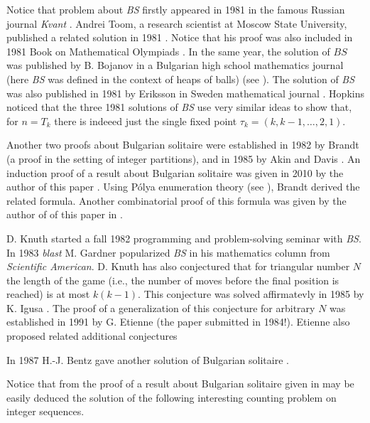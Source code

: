 \documentclass[oneside,12pt]{amsart}
\theoremstyle{definition}
\numberwithin{equation}{section}
\begin{document}
Notice that problem about {\it BS} firstly appeared in 1981 in the famous 
Russian journal 
{\it Kvant} \cite{to}. Andrei Toom, a research scientist at Moscow State 
University, published a related solution in 1981 \cite{to}.
Notice that his proof was also included in  1981  Book on Mathematical 
Olympiads \cite{vgrt}. In the same year, the solution of $BS$
was published  by B. Bojanov  in a Bulgarian high school mathematics 
journal  \cite{bo} (here {\it BS} was defined in the context of heaps of 
balls) (see \cite{dr}).  The solution   of {\it BS} was also published in 1981 by 
Eriksson in Sweden mathematical journal \cite{er}. Hopkins \cite{ho}
noticed that the three  1981 solutions of {\it BS} use 
very similar ideas to show that, for $n=T_k$    there is indeeed 
just the single fixed point $\tau_k=(k,k-1,\ldots,2,1)$.
 

Another two proofs about Bulgarian solitaire were established in 1982 by  Brandt
\cite{br} (a proof in the setting of integer partitions),
and in 1985 by Akin and  Davis \cite{ad}. 
 An induction proof of a result about Bulgarian solitaire was given in 2010
by the author of this paper \cite{me1}.    
Using P\'{o}lya enumeration theory (see \cite{bi}), Brandt \cite{br}
 derived the related formula.
Another combinatorial proof of this formula was  given by the author of 
of this paper in \cite{me3}.

D. Knuth \cite{hk} started a fall 1982 programming and problem-solving seminar 
with {\it BS}. In 1983 {\it blast} M. Gardner \cite{ga} popularized 
{\it BS} in his mathematics column from {\it Scientific American}.
D. Knuth has also conjectured that for triangular number $N$ the length 
of the game (i.e., the number of moves before the final position is reached)
is at most $k(k-1)$. This conjecture was solved 
affirmatevly 
in 1985 by K. Igusa  \cite{ig}. The proof of a generalization 
of this conjecture for arbitrary $N$ was established in 1991 by G. Etienne
\cite[Theorem 5.1]{et} (the paper submitted in 1984!). Etienne also 
proposed related additional conjectures \cite[Conjecture 5.2]{et}
 
 In 1987 H.-J. Bentz gave another solution of Bulgarian solitaire \cite{ben}. 


Notice that from the proof of a result about Bulgarian solitaire 
 given in  \cite{me1} 
 may be easily deduced the solution of the following interesting 
counting problem on integer sequences.  


\vspace{2mm}
\end{document}
